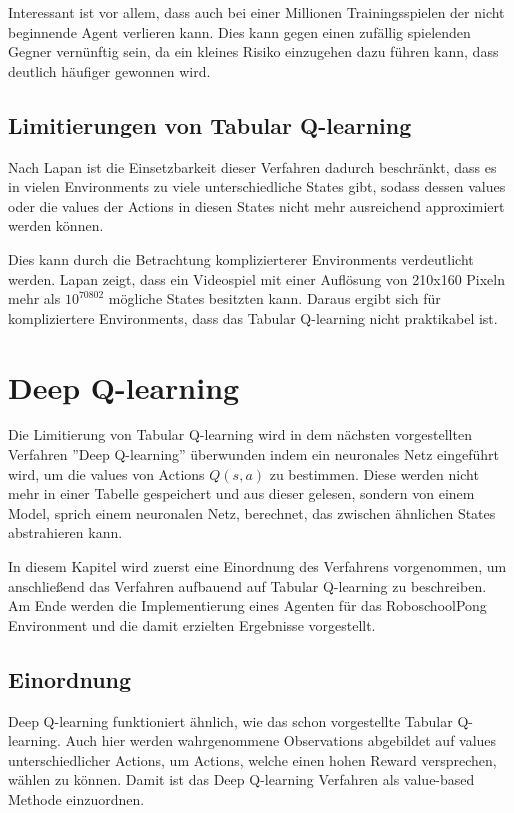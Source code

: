 \documentclass[11pt]{scrartcl}
\begin{document}
Interessant ist vor allem, dass auch bei einer Millionen Trainingsspielen der nicht
beginnende Agent verlieren kann. Dies kann gegen einen zufällig spielenden Gegner
vernünftig sein, da ein kleines Risiko einzugehen dazu führen kann, dass deutlich häufiger
gewonnen wird. %


\subsection{Limitierungen von Tabular Q-learning}
\label{sec:tabular_q_learning_limits}
Nach Lapan\cite[~S.192]{L2018} ist die Einsetzbarkeit dieser Verfahren dadurch
beschränkt, dass es in vielen Environments zu viele unterschiedliche States gibt, sodass
dessen values oder die values der Actions in diesen States nicht mehr ausreichend
approximiert werden können.

Dies kann durch die Betrachtung komplizierterer Environments verdeutlicht werden. Lapan
\cite[~S.192]{L2018} zeigt, dass ein Videospiel mit einer Auflösung von 210x160 Pixeln
mehr als $10^{70802}$ mögliche States besitzten kann. Daraus ergibt sich für
kompliziertere Environments, dass das Tabular Q-learning nicht praktikabel ist.

\newpage
\section{Deep Q-learning}
\label{sec:dqn}
Die Limitierung von Tabular Q-learning wird in dem nächsten vorgestellten Verfahren
''Deep Q-learning'' überwunden indem ein neuronales Netz eingeführt wird, um die values
von Actions $Q(s, a)$ zu bestimmen. Diese werden nicht mehr in einer Tabelle gespeichert
und aus dieser gelesen, sondern von einem Model, sprich einem neuronalen Netz, berechnet,
das zwischen ähnlichen States abstrahieren kann.

In diesem Kapitel wird zuerst eine Einordnung des Verfahrens vorgenommen, um anschließend
das Verfahren aufbauend auf Tabular Q-learning zu beschreiben. Am Ende werden die	
Implementierung eines Agenten für das RoboschoolPong Environment und die damit erzielten
Ergebnisse vorgestellt.

\subsection{Einordnung}
Deep Q-learning funktioniert ähnlich, wie das schon vorgestellte Tabular Q-learning. Auch
hier werden wahrgenommene Observations abgebildet auf values unterschiedlicher Actions, um
Actions, welche einen hohen Reward versprechen, wählen zu können. Damit ist das Deep 
Q-learning Verfahren als value-based Methode einzuordnen.
\end{document}
